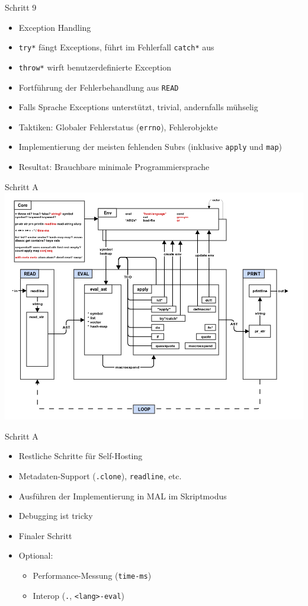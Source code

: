 \documentclass[presentation]{beamer}
\begin{document}
\begin{frame}[fragile,label=sec-3-25]{Schritt 9}
 \begin{itemize}
\item Exception Handling
\item \texttt{try*} fängt Exceptions, führt im Fehlerfall \texttt{catch*} aus
\item \texttt{throw*} wirft benutzerdefinierte Exception
\item Fortführung der Fehlerbehandlung aus \texttt{READ}
\item Falls Sprache Exceptions unterstützt, trivial, andernfalls mühselig
\item Taktiken: Globaler Fehlerstatus (\texttt{errno}), Fehlerobjekte
\item Implementierung der meisten fehlenden Subrs (inklusive \texttt{apply} und
\texttt{map})
\item Resultat: Brauchbare minimale Programmiersprache
\end{itemize}
\end{frame}

\begin{frame}[label=sec-3-26]{Schritt A}
\includegraphics[width=.9\linewidth]{./images/stepA_mal.png}
\end{frame}

\begin{frame}[fragile,label=sec-3-27]{Schritt A}
 \begin{itemize}
\item Restliche Schritte für Self-Hosting
\item Metadaten-Support (\texttt{.clone}), \texttt{readline}, etc.
\item Ausführen der Implementierung in MAL im Skriptmodus
\item Debugging ist tricky
\item Finaler Schritt
\item Optional:
\begin{itemize}
\item Performance-Messung (\texttt{time-ms})
\item Interop (\texttt{.}, \texttt{<lang>-eval})
\end{itemize}
\end{itemize}
\end{frame}
\end{document}
